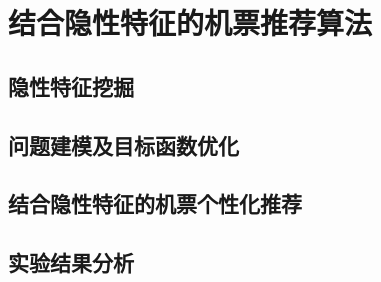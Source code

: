 
\chapter{结合隐性特征的机票推荐算法}
\label{chap:latent}

\section{隐性特征挖掘}

\section{问题建模及目标函数优化}

\section{结合隐性特征的机票个性化推荐}

\section{实验结果分析}